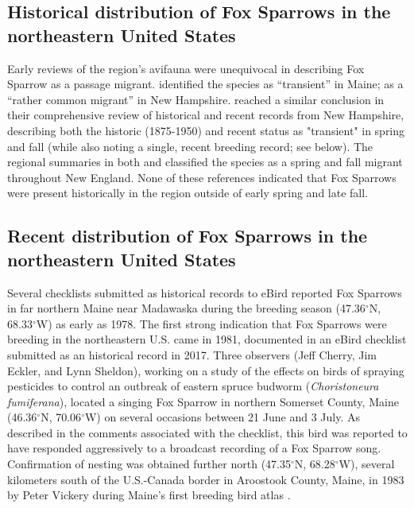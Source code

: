 \documentclass[fleqn,10pt,lineno]{wlpeerj} %
\begin{document}
\subsection*{Historical distribution of Fox Sparrows in the northeastern United States}
Early reviews of the region’s avifauna were unequivocal in describing Fox Sparrow as a passage migrant. \cite{Palmer1949-ig} identified the species as “transient” in Maine; \cite{Allen1903-xq} as a “rather common migrant” in New Hampshire. \cite{Keith2013-gt} reached a similar conclusion in their comprehensive review of historical and recent records from New Hampshire, describing both the historic (1875-1950) and recent status as "transient" in spring and fall (while also noting a single, recent breeding record; see below). The regional summaries in both \cite{Samuels1875-jo} and \cite{Forbush1929-pq} classified the species as a spring and fall migrant throughout New England. None of these references indicated that Fox Sparrows were present historically in the region outside of early spring and late fall. 

\subsection*{Recent distribution of Fox Sparrows in the northeastern United States}
Several checklists submitted as historical records to eBird reported Fox Sparrows in far northern Maine near Madawaska during the breeding season (47.36$^{\circ}$N, 68.33$^{\circ}$W) as early as 1978. The first strong indication that Fox Sparrows were breeding in the northeastern U.S. came in 1981, documented in an eBird checklist submitted as an historical record in 2017. Three observers (Jeff Cherry, Jim Eckler, and Lynn Sheldon), working on a study of the effects on birds of spraying pesticides to control an outbreak of eastern spruce budworm (\textit{Choristoneura fumiferana}), located a singing Fox Sparrow in northern Somerset County, Maine (46.36$^{\circ}$N, 70.06$^{\circ}$W) on several occasions between 21 June and 3 July. As described in the comments associated with the checklist, this bird was reported to have responded aggressively to a broadcast recording of a Fox Sparrow song. Confirmation of nesting was obtained further north (47.35$^{\circ}$N, 68.28$^{\circ}$W), several kilometers south of the U.S.-Canada border in Aroostook County, Maine, in 1983 by Peter Vickery during Maine’s first breeding bird atlas \citep{Adamus1988-xw}. 
\end{document}
